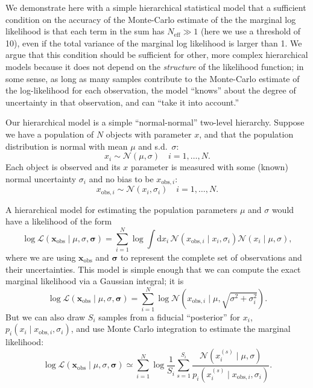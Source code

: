 \documentclass[modern]{aastex631}
\newcommand{\dd}{\mathrm{d}}
\newcommand{\Neff}{N_{\mathrm{eff}}}
\begin{document}
We demonstrate here with a simple hierarchical statistical model that a
sufficient condition on the accuracy of the Monte-Carlo estimate of the the
marginal log likelihood is that each term in the sum has $\Neff \gg 1$ (here we
use a threshold of 10), even if the total variance of the marginal log
likelihood is larger than 1.  We argue that this condition should be sufficient
for other, more complex hierarchical models because it does not depend on the
\emph{structure} of the likelihood function; in some sense, as long as many
samples contribute to the Monte-Carlo estimate of the log-likelihood for each
observation, the model ``knows'' about the degree of uncertainty in that
observation, and can ``take it into account.''

Our hierarchical model is a simple ``normal-normal'' two-level hierarchy.
Suppose we have a population of $N$ objects with parameter $x$, and that the
population distribution is normal with mean $\mu$ and s.d.\ $\sigma$:
\begin{equation}
    x_i \sim \mathcal{N}\left( \mu, \sigma \right) \quad i = 1, \ldots, N.
\end{equation}
Each object is observed and its $x$ parameter is measured with some (known)
normal uncertainty $\sigma_i$ and no bias to be $x_{\mathrm{obs},i}$:
\begin{equation}
    x_{\mathrm{obs},i} \sim \mathcal{N}\left( x_i, \sigma_i \right) \quad i = 1, \ldots, N.
\end{equation}

A hierarchical model for estimating the population parameters $\mu$ and
$\sigma$ would have a likelihood of the form 
\begin{equation}
    \log \mathcal{L}\left( \mathbf{x}_{\mathrm{obs}} \mid \mu, \sigma, \boldsymbol{\sigma} \right) = \sum_{i=1}^{N} \log \int \dd x_i \, \mathcal{N}\left( x_{\mathrm{obs},i} \mid x_i, \sigma_i \right) \mathcal{N}\left( x_i \mid \mu, \sigma \right),
\end{equation}
where we are using $\mathbf{x}_\mathrm{obs}$ and $\boldsymbol{\sigma}$ to
represent the complete set of observations and their uncertainties.  This model
is simple enough that we can compute the exact marginal likelihood via a
Gaussian integral; it is 
\begin{equation}
    \log \mathcal{L}\left( \mathbf{x}_{\mathrm{obs}} \mid \mu, \sigma, \boldsymbol{\sigma} \right) = \sum_{i=1}^N \log \mathcal{N}\left( x_{\mathrm{obs},i} \mid \mu, \sqrt{\sigma^2 + \sigma_i^2} \right).
\end{equation}
But we can also draw $S_i$ samples from a fiducial ``posterior'' for $x_i$, $p_i\left( x_i \mid x_{\mathrm{obs},i}, \sigma_i \right)$, and use Monte Carlo integration to estimate the marginal likelihood:
\begin{equation}
    \log \mathcal{L}\left( \mathbf{x}_{\mathrm{obs}} \mid \mu, \sigma, \boldsymbol{\sigma} \right) \simeq \sum_{i=1}^N \log \frac{1}{S_i} \sum_{s=1}^{S_i} \frac{\mathcal{N}\left( x_i^{(s)} \mid \mu, \sigma \right)}{p_i\left( x_i^{(s)} \mid x_{\mathrm{obs},i}, \sigma_i \right)}.
\end{equation}
\end{document}
